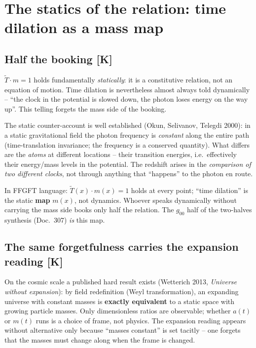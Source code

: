 \chapter{The statics of the relation: time dilation as a mass map}

\section{Half the booking [K]}

$\tilde T \cdot m = 1$ holds fundamentally \emph{statically}: it is
a constitutive relation, not an equation of motion. Time dilation
is nevertheless almost always told dynamically -- \enquote{the
clock in the potential is slowed down, the photon loses energy on
the way up}. This telling forgets the mass side of the booking.

The static counter-account is well established (Okun, Selivanov,
Telegdi 2000): in a static gravitational field the photon frequency
is \emph{constant} along the entire path (time-translation
invariance; the frequency is a conserved quantity). What differs
are the \emph{atoms} at different locations -- their transition
energies, i.e.\ effectively their energy/mass levels in the
potential. The redshift arises in the \emph{comparison of two
different clocks}, not through anything that \enquote{happens} to
the photon en route.

In FFGFT language: $\tilde T(x)\cdot m(x) = 1$ holds at every
point; \enquote{time dilation} is the static \textbf{map} $m(x)$,
not dynamics. Whoever speaks dynamically without carrying the mass
side books only half the relation. The $g_{00}$ half of the
two-halves synthesis (Doc.~307) \emph{is} this map.

\section{The same forgetfulness carries the expansion reading [K]}

On the cosmic scale a published hard result exists (Wetterich 2013,
\emph{Universe without expansion}): by field redefinition (Weyl
transformation), an expanding universe with constant masses is
\textbf{exactly equivalent} to a static space with growing particle
masses. Only dimensionless ratios are observable; whether $a(t)$ or
$m(t)$ runs is a choice of frame, not physics. The expansion
reading appears without alternative only because \enquote{masses
constant} is set tacitly -- one forgets that the masses must change
along when the frame is changed.

